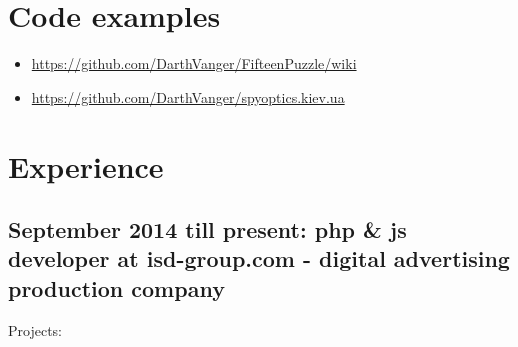 \documentclass[a4paper, 14pt]{article}
\begin{document}
\section{Code examples}
\begin{itemize}
    \item \url{https://github.com/DarthVanger/FifteenPuzzle/wiki}
    \\
    \item \url{https://github.com/DarthVanger/spyoptics.kiev.ua}
\end{itemize}

\section{Experience}
	\subsection{September 2014 till present: php \& js developer at isd-group.com - digital advertising production company}
    Projects:
\end{document}
